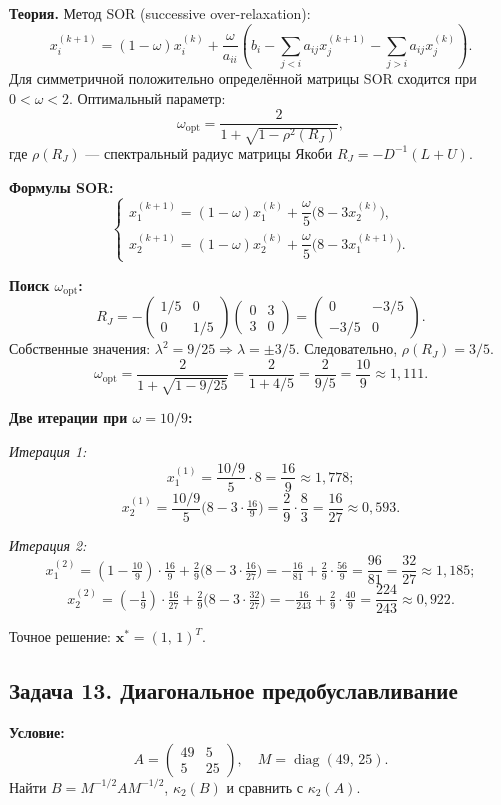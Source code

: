 \documentclass{article}
\begin{document}
\textbf{Теория.} Метод SOR (successive over-relaxation):
$$x_i^{(k+1)} = (1-\omega)x_i^{(k)} + \frac{\omega}{a_{ii}}\left(b_i - \sum_{j<i}a_{ij}x_j^{(k+1)} - \sum_{j>i}a_{ij}x_j^{(k)}\right).$$
Для симметричной положительно определённой матрицы SOR сходится при $0 < \omega < 2$. Оптимальный параметр:
$$\omega_{\text{opt}} = \frac{2}{1 + \sqrt{1 - \rho^2(R_J)}},$$
где $\rho(R_J)$ — спектральный радиус матрицы Якоби $R_J = -D^{-1}(L+U)$.

\textbf{Формулы SOR:}
$$
\begin{cases}
x_1^{(k+1)} = (1-\omega)x_1^{(k)} + \dfrac{\omega}{5}\bigl(8 - 3x_2^{(k)}\bigr), \\[6pt]
x_2^{(k+1)} = (1-\omega)x_2^{(k)} + \dfrac{\omega}{5}\bigl(8 - 3x_1^{(k+1)}\bigr).
\end{cases}
$$

\textbf{Поиск $\omega_{\text{opt}}$:}
$$R_J = -\begin{pmatrix} 1/5 & 0 \\ 0 & 1/5 \end{pmatrix}\begin{pmatrix} 0 & 3 \\ 3 & 0 \end{pmatrix} = \begin{pmatrix} 0 & -3/5 \\ -3/5 & 0 \end{pmatrix}.$$
Собственные значения: $\lambda^2 = 9/25 \Rightarrow \lambda = \pm 3/5$. Следовательно, $\rho(R_J) = 3/5$.
$$\omega_{\text{opt}} = \frac{2}{1 + \sqrt{1 - 9/25}} = \frac{2}{1 + 4/5} = \frac{2}{9/5} = \frac{10}{9} \approx 1,111.$$

\textbf{Две итерации при $\omega = 10/9$:}

\textit{Итерация 1:}
$$x_1^{(1)} = \frac{10/9}{5}\cdot 8 = \frac{16}{9} \approx 1,778;$$
$$x_2^{(1)} = \frac{10/9}{5}\bigl(8 - 3\cdot\tfrac{16}{9}\bigr) = \frac{2}{9}\cdot\frac{8}{3} = \frac{16}{27} \approx 0,593.$$

\textit{Итерация 2:}
$$x_1^{(2)} = \left(1-\tfrac{10}{9}\right)\cdot\tfrac{16}{9} + \tfrac{2}{9}\bigl(8 - 3\cdot\tfrac{16}{27}\bigr) = -\tfrac{16}{81} + \tfrac{2}{9}\cdot\tfrac{56}{9} = \frac{96}{81} = \frac{32}{27} \approx 1,185;$$
$$x_2^{(2)} = \left(-\tfrac{1}{9}\right)\cdot\tfrac{16}{27} + \tfrac{2}{9}\bigl(8 - 3\cdot\tfrac{32}{27}\bigr) = -\tfrac{16}{243} + \tfrac{2}{9}\cdot\tfrac{40}{9} = \frac{224}{243} \approx 0,922.$$

Точное решение: $\textbf{x}^* = (1,\, 1)^T$.


\subsection*{Задача 13. Диагональное предобуславливание}
\textbf{Условие:}
$$
A = \begin{pmatrix} 49 & 5 \\ 5 & 25 \end{pmatrix}, \quad M = \operatorname{diag}(49,\, 25).
$$
Найти $B = M^{-1/2}AM^{-1/2}$, $\kappa_2(B)$ и сравнить с $\kappa_2(A)$.
\end{document}
